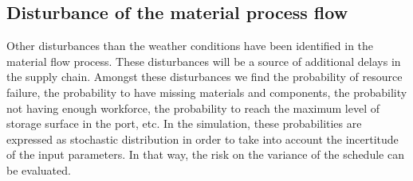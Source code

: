 \subsection{Disturbance of the material process flow}
Other disturbances than the weather conditions have been identified in the material flow process. These disturbances will be a source of additional delays in the supply chain. Amongst these disturbances we find the probability of resource failure, the probability to have missing materials and components, the probability not having enough workforce, the probability to reach the maximum level of storage surface in the port, etc. In the simulation, these probabilities are expressed as stochastic distribution in order to take into account the incertitude of the input parameters. In that way, the risk on the variance of the schedule can be evaluated.
